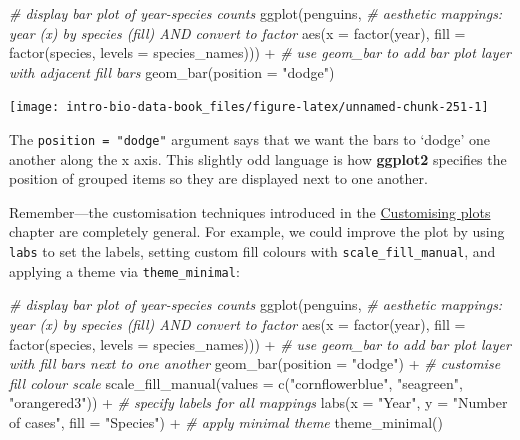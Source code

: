 \documentclass[
]{book}
\newenvironment{Shaded}{\begin{snugshade}}{\end{snugshade}}
\newcommand{\AttributeTok}[1]{\textcolor[rgb]{0.77,0.63,0.00}{#1}}
\newcommand{\CommentTok}[1]{\textcolor[rgb]{0.56,0.35,0.01}{\textit{#1}}}
\newcommand{\FunctionTok}[1]{\textcolor[rgb]{0.00,0.00,0.00}{#1}}
\newcommand{\NormalTok}[1]{#1}
\newcommand{\SpecialCharTok}[1]{\textcolor[rgb]{0.00,0.00,0.00}{#1}}
\newcommand{\StringTok}[1]{\textcolor[rgb]{0.31,0.60,0.02}{#1}}
\begin{document}
\begin{Shaded}
\begin{Highlighting}[]
\CommentTok{\# display bar plot of year{-}species counts}
\FunctionTok{ggplot}\NormalTok{(penguins, }
       \CommentTok{\# aesthetic mappings: year (x) by species (fill) AND convert to factor}
       \FunctionTok{aes}\NormalTok{(}\AttributeTok{x =} \FunctionTok{factor}\NormalTok{(year), }\AttributeTok{fill =} \FunctionTok{factor}\NormalTok{(species, }\AttributeTok{levels =}\NormalTok{ species\_names))) }\SpecialCharTok{+}
  \CommentTok{\# use geom\_bar to add bar plot layer with adjacent fill bars}
  \FunctionTok{geom\_bar}\NormalTok{(}\AttributeTok{position =} \StringTok{"dodge"}\NormalTok{)}
\end{Highlighting}
\end{Shaded}

\begin{center}\texttt{[image: intro-bio-data-book\_files/figure-latex/unnamed-chunk-251-1]} \end{center}

The \texttt{position\ =\ "dodge"} argument says that we want the bars to `dodge' one another along the x axis. This slightly odd language is how \textbf{ggplot2} specifies the position of grouped items so they are displayed next to one another.

Remember---the customisation techniques introduced in the \protect\hyperlink{chapter-customise-ggplot2}{Customising plots} chapter are completely general. For example, we could improve the plot by using \texttt{labs} to set the labels, setting custom fill colours with \texttt{scale\_fill\_manual}, and applying a theme via \texttt{theme\_minimal}:

\begin{Shaded}
\begin{Highlighting}[]
\CommentTok{\# display bar plot of year{-}species counts}
\FunctionTok{ggplot}\NormalTok{(penguins, }
       \CommentTok{\# aesthetic mappings: year (x) by species (fill) AND convert to factor}
       \FunctionTok{aes}\NormalTok{(}\AttributeTok{x =} \FunctionTok{factor}\NormalTok{(year), }\AttributeTok{fill =} \FunctionTok{factor}\NormalTok{(species, }\AttributeTok{levels =}\NormalTok{ species\_names))) }\SpecialCharTok{+}
  \CommentTok{\# use geom\_bar to add bar plot layer with fill bars next to one another}
  \FunctionTok{geom\_bar}\NormalTok{(}\AttributeTok{position =} \StringTok{"dodge"}\NormalTok{) }\SpecialCharTok{+}
  \CommentTok{\# customise fill colour scale}
  \FunctionTok{scale\_fill\_manual}\NormalTok{(}\AttributeTok{values =} \FunctionTok{c}\NormalTok{(}\StringTok{"cornflowerblue"}\NormalTok{, }\StringTok{"seagreen"}\NormalTok{, }\StringTok{"orangered3"}\NormalTok{)) }\SpecialCharTok{+}
  \CommentTok{\# specify labels for all mappings}
  \FunctionTok{labs}\NormalTok{(}\AttributeTok{x =} \StringTok{"Year"}\NormalTok{, }\AttributeTok{y =} \StringTok{"Number of cases"}\NormalTok{, }\AttributeTok{fill =} \StringTok{"Species"}\NormalTok{) }\SpecialCharTok{+}
  \CommentTok{\# apply minimal theme}
  \FunctionTok{theme\_minimal}\NormalTok{()}
\end{Highlighting}
\end{Shaded}
\end{document}
